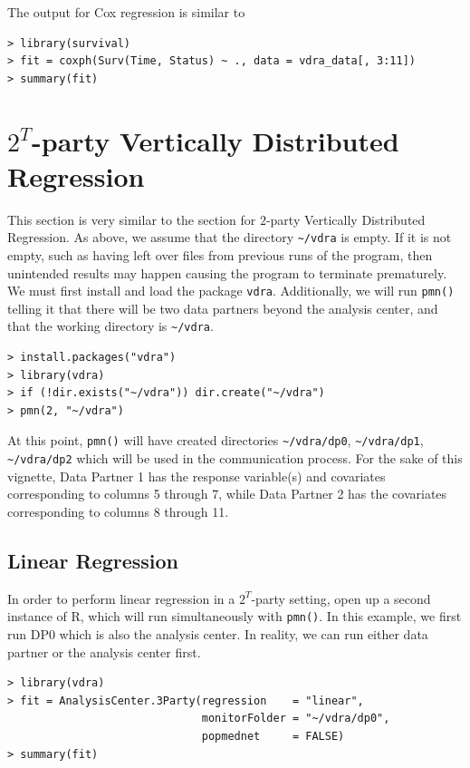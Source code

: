 \documentclass[12]{article}
\begin{document}
The output for Cox regression is similar to 

\begin{verbatim}
> library(survival)
> fit = coxph(Surv(Time, Status) ~ ., data = vdra_data[, 3:11])
> summary(fit)            
\end{verbatim}

\section{$2^T$-party Vertically Distributed Regression}

This section is very similar to the section for $2$-party Vertically Distributed Regression.  As above, we assume that the directory \verb"~/vdra" is empty.  If it is not empty, such as having left over files from previous runs of the program, then unintended results may happen causing the program to terminate prematurely.  We must first install and load the package \verb"vdra".  Additionally, we will run \verb"pmn()" telling it that there will be two data partners beyond the analysis center, and that the working directory is \verb"~/vdra".

\begin{verbatim}
> install.packages("vdra")
> library(vdra)
> if (!dir.exists("~/vdra")) dir.create("~/vdra")
> pmn(2, "~/vdra")
\end{verbatim}

At this point, \verb"pmn()" will have created directories \verb"~/vdra/dp0", \verb"~/vdra/dp1", \verb"~/vdra/dp2" which will be used in the communication process.  For the sake of this vignette, Data Partner 1 has the response variable(s) and covariates corresponding to columns 5 through 7, while Data Partner 2 has the covariates corresponding to columns 8 through 11.

\subsection{Linear Regression}

In order to perform linear regression in a $2^T$-party setting, open up a second instance of R, which will run simultaneously with \verb"pmn()".  In this example, we first run DP0 which is also the analysis center.  In reality, we can run either data partner or the analysis center first.

\begin{verbatim}
> library(vdra)
> fit = AnalysisCenter.3Party(regression    = "linear",
                              monitorFolder = "~/vdra/dp0",
                              popmednet     = FALSE)
> summary(fit)
\end{verbatim}
\end{document}
